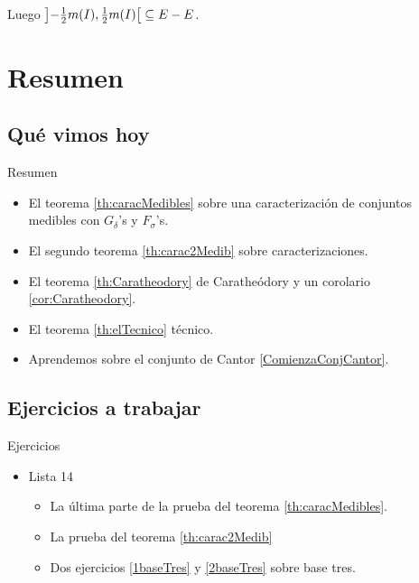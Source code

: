 \documentclass[utf8]{beamer}
\theoremstyle{plain}
\theoremstyle{definition}
\theoremstyle{remark}
\numberwithin{equation}{section}
\newcommand{\dl}{\delta}                %
\newcommand{\sg}{\sigma}                %
\newcommand{\obonj}[1]{\left\rbrack#1\right\lbrack}
\newcommand{\half}{{\mathchoice{\nhalf}{\thalf}{\shalf}{\shalf}}} %
\newcommand{\nhalf}{\frac{1}{2}}
\newcommand{\shalf}{{\scriptstyle\frac{1}{2}}} %
\newcommand{\thalf}{{\tfrac{1}{2}}} %
\renewcommand{\.}{\Cdot}                %
\begin{document}
\begin{frame}
  Luego $\obonj{-\half m(I),\half m(I)}\subseteq E-E$. 
\end{frame}
\section*{Resumen}

\subsection*{Qu\'e vimos hoy}

\begin{frame}{Resumen}

  \begin{itemize}
  \item El teorema \ref{th:caracMedibles} sobre una caracterización de conjuntos medibles con $G_\dl$'s y $F_\sg$'s. 
  \item El segundo teorema \ref{th:carac2Medib} sobre caracterizaciones.
  \item El teorema \ref{th:Caratheodory} de Carathe\'odory y un corolario \ref{cor:Caratheodory}.
  \item El teorema \ref{th:elTecnico} t\'ecnico.
  \item Aprendemos sobre el conjunto de Cantor \ref{ComienzaConjCantor}.
  \end{itemize}
  
\end{frame}

\subsection*{Ejercicios a trabajar}
\begin{frame}{Ejercicios}
    
  \begin{itemize}
    \item
      Lista 14
      \begin{itemize}
      \item La última parte de la prueba del teorema \ref{th:caracMedibles}.
      \item La prueba del teorema \ref{th:carac2Medib}
      \item Dos ejercicios \ref{1baseTres} y \ref{2baseTres} sobre base tres.
      \end{itemize}
    \end{itemize}
  
\end{frame}
\end{document}
